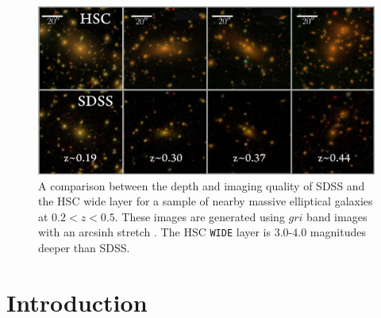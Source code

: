 \documentclass[a4paper,fleqn,usenatbib]{mnras}
\begin{document}
    \begin{figure}
        \centering 
        \includegraphics[width=\textwidth]{fig/redbcg_sdss_compare}
        \caption{
            A comparison between the depth and imaging quality of SDSS and the HSC wide 
            layer for a sample of nearby massive elliptical galaxies at $0.2 < z < 0.5$.  
            These images are generated using $gri$ band images with an arcsinh stretch 
            \citep{Lupton2004}. 
            The HSC \texttt{WIDE} layer is $3.0$-$4.0$ magnitudes deeper than SDSS.
            }
        \label{fig:sdss_compare}
    \end{figure}

\section{Introduction}
    \label{sec:intro}
    
\end{document}
